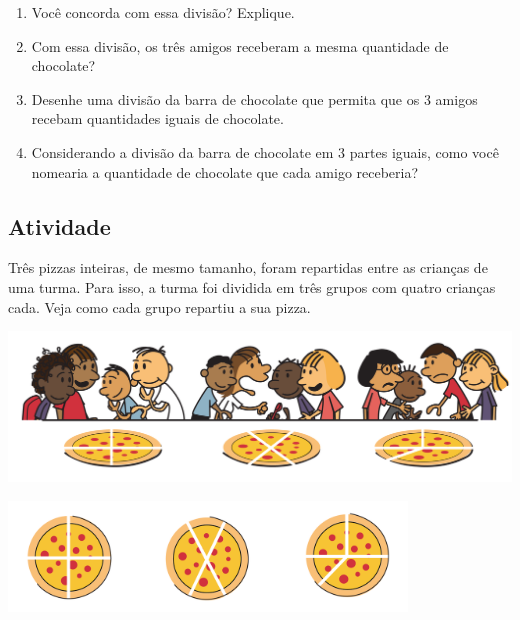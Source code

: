 \begin{enumerate} [\quad a)] %
  \item Você concorda com essa divisão? Explique.
  \item Com essa divisão, os três amigos receberam a mesma quantidade de chocolate?
  \item Desenhe uma divisão da barra de chocolate que permita que os 3 amigos recebam quantidades iguais de chocolate.
    \begin{center}

    \end{center}
  \item Considerando a divisão da barra de chocolate em 3 partes iguais, como você nomearia a quantidade de chocolate que cada amigo receberia?
\end{enumerate} %

\subsection{Atividade}
Três pizzas inteiras, de mesmo tamanho, foram repartidas entre as crianças de uma turma. Para isso, a turma foi dividida em três grupos com quatro crianças cada. Veja como cada grupo repartiu a sua pizza.

  \begin{center}
    \includegraphics[width=400pt, keepaspectratio]{../figuras/licao01/ativ2_fig01.png}

    \includegraphics[width=300pt, keepaspectratio]{../figuras/licao01/ativ2_fig02.png}
  \end{center}

